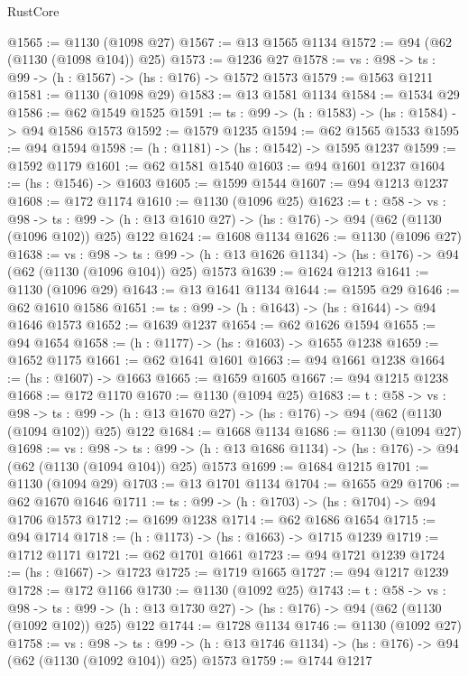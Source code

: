 \begin{lexlean}{RustCore}
\begin{coremodule}
@1565 := @1130 (@1098 @27)
@1567 := @13 @1565 @1134
@1572 := @94 (@62 (@1130 (@1098 @104)) @25)
@1573 := @1236 @27
@1578 := {vs : @98} -> {ts : @99} -> (h : @1567) -> (hs : @176) -> @1572 @1573
@1579 := @1563 @1211
@1581 := @1130 (@1098 @29)
@1583 := @13 @1581 @1134
@1584 := @1534 @29
@1586 := @62 @1549 @1525
@1591 := {ts : @99} -> (h : @1583) -> (hs : @1584) -> @94 @1586 @1573
@1592 := @1579 @1235
@1594 := @62 @1565 @1533
@1595 := @94 @1594
@1598 := (h : @1181) -> (hs : @1542) -> @1595 @1237
@1599 := @1592 @1179
@1601 := @62 @1581 @1540
@1603 := @94 @1601 @1237
@1604 := (hs : @1546) -> @1603
@1605 := @1599 @1544
@1607 := @94 @1213 @1237
@1608 := @172 @1174
@1610 := @1130 (@1096 @25)
@1623 := {t : @58} ->
  {vs : @98} ->
  {ts : @99} -> (h : @13 @1610 @27) -> (hs : @176) -> @94 (@62 (@1130 (@1096 @102)) @25) @122
@1624 := @1608 @1134
@1626 := @1130 (@1096 @27)
@1638 := {vs : @98} ->
  {ts : @99} -> (h : @13 @1626 @1134) -> (hs : @176) -> @94 (@62 (@1130 (@1096 @104)) @25) @1573
@1639 := @1624 @1213
@1641 := @1130 (@1096 @29)
@1643 := @13 @1641 @1134
@1644 := @1595 @29
@1646 := @62 @1610 @1586
@1651 := {ts : @99} -> (h : @1643) -> (hs : @1644) -> @94 @1646 @1573
@1652 := @1639 @1237
@1654 := @62 @1626 @1594
@1655 := @94 @1654
@1658 := (h : @1177) -> (hs : @1603) -> @1655 @1238
@1659 := @1652 @1175
@1661 := @62 @1641 @1601
@1663 := @94 @1661 @1238
@1664 := (hs : @1607) -> @1663
@1665 := @1659 @1605
@1667 := @94 @1215 @1238
@1668 := @172 @1170
@1670 := @1130 (@1094 @25)
@1683 := {t : @58} ->
  {vs : @98} ->
  {ts : @99} -> (h : @13 @1670 @27) -> (hs : @176) -> @94 (@62 (@1130 (@1094 @102)) @25) @122
@1684 := @1668 @1134
@1686 := @1130 (@1094 @27)
@1698 := {vs : @98} ->
  {ts : @99} -> (h : @13 @1686 @1134) -> (hs : @176) -> @94 (@62 (@1130 (@1094 @104)) @25) @1573
@1699 := @1684 @1215
@1701 := @1130 (@1094 @29)
@1703 := @13 @1701 @1134
@1704 := @1655 @29
@1706 := @62 @1670 @1646
@1711 := {ts : @99} -> (h : @1703) -> (hs : @1704) -> @94 @1706 @1573
@1712 := @1699 @1238
@1714 := @62 @1686 @1654
@1715 := @94 @1714
@1718 := (h : @1173) -> (hs : @1663) -> @1715 @1239
@1719 := @1712 @1171
@1721 := @62 @1701 @1661
@1723 := @94 @1721 @1239
@1724 := (hs : @1667) -> @1723
@1725 := @1719 @1665
@1727 := @94 @1217 @1239
@1728 := @172 @1166
@1730 := @1130 (@1092 @25)
@1743 := {t : @58} ->
  {vs : @98} ->
  {ts : @99} -> (h : @13 @1730 @27) -> (hs : @176) -> @94 (@62 (@1130 (@1092 @102)) @25) @122
@1744 := @1728 @1134
@1746 := @1130 (@1092 @27)
@1758 := {vs : @98} ->
  {ts : @99} -> (h : @13 @1746 @1134) -> (hs : @176) -> @94 (@62 (@1130 (@1092 @104)) @25) @1573
@1759 := @1744 @1217

\end{coremodule}
\end{lexlean}
